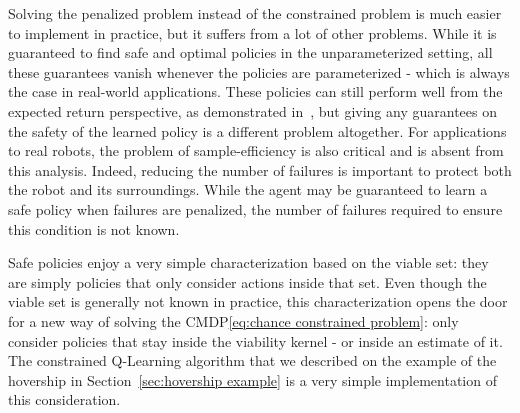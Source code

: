 Solving the penalized problem instead of the constrained problem is much easier to implement in practice, but it suffers from a lot of other problems. While it is guaranteed to find safe and optimal policies in the unparameterized setting, all these guarantees vanish whenever the policies are parameterized - which is always the case in real-world applications. These policies can still perform well from the expected return perspective, as demonstrated in~\cite{paternain2019safe}, but giving any guarantees on the safety of the learned policy is a different problem altogether. For applications to real robots, the problem of sample-efficiency is also critical and is absent from this analysis. Indeed, reducing the number of failures is important to protect both the robot and its surroundings. While the agent may be guaranteed to learn a safe policy when failures are penalized, the number of failures required to ensure this condition is not known.\par
Safe policies enjoy a very simple characterization based on the viable set: they are simply policies that only consider actions inside that set. Even though the viable set is generally not known in practice, this characterization opens the door for a new way of solving the CMDP\eqref{eq:chance constrained problem}: only consider policies that stay inside the viability kernel - or inside an estimate of it. The constrained Q-Learning algorithm that we described on the example of the hovership in Section~\ref{sec:hovership example} is a very simple implementation of this consideration.